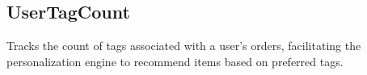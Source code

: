 \subsection{UserTagCount}
Tracks the count of tags associated with a user's orders, facilitating the personalization engine to recommend items based on preferred tags.



